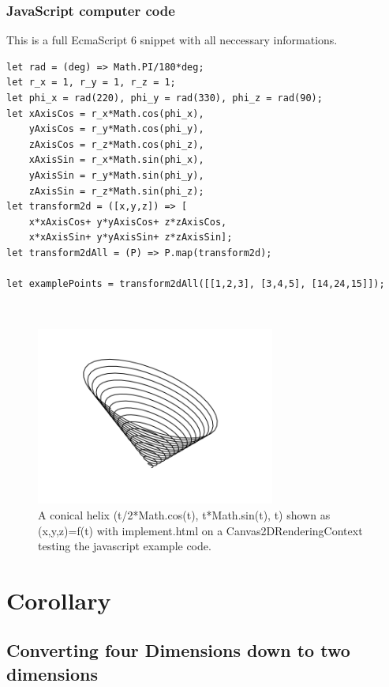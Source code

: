 \documentclass[a4paper]{article}
\begin{document}
\subsubsection{JavaScript computer code}
\begin{example}
This is a full EcmaScript 6 snippet with all neccessary informations.\\
\begin{lstlisting}
let rad = (deg) => Math.PI/180*deg;
let r_x = 1, r_y = 1, r_z = 1; 
let phi_x = rad(220), phi_y = rad(330), phi_z = rad(90); 
let xAxisCos = r_x*Math.cos(phi_x), 
    yAxisCos = r_y*Math.cos(phi_y),
    zAxisCos = r_z*Math.cos(phi_z),
    xAxisSin = r_x*Math.sin(phi_x), 
    yAxisSin = r_y*Math.sin(phi_y),
    zAxisSin = r_z*Math.sin(phi_z);
let transform2d = ([x,y,z]) => [
    x*xAxisCos+ y*yAxisCos+ z*zAxisCos,
    x*xAxisSin+ y*yAxisSin+ z*zAxisSin];
let transform2dAll = (P) => P.map(transform2d);

let examplePoints = transform2dAll([[1,2,3], [3,4,5], [14,24,15]]);
\end{lstlisting}
\end{example}\\



\begin{figure}[ht]
\includegraphics[scale=0.5]{conicalhelix.png}
\caption{A conical helix (t/2*Math.cos(t), t*Math.sin(t), t) shown as (x,y,z)=f(t) with implement.html on a Canvas2DRenderingContext testing the javascript example code.}
\end{figure}




\section{Corollary}

\subsection{Converting four Dimensions down to two dimensions}\\
\end{document}
